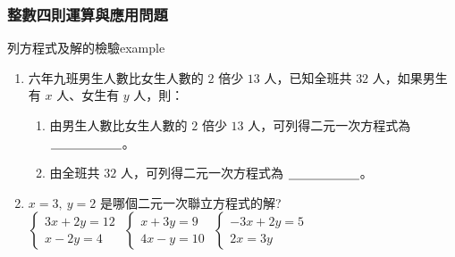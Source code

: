 \documentclass[bwprint,a4paper]{extarticle}
\begin{document}
\subsubsection{整數四則運算與應用問題}
\begin{question}{列方程式及解的檢驗}{example}
	\begin{enumerate}
		\item 六年九班男生人數比女生人數的 $2$ 倍少 $13$ 人，已知全班共 $32$ 人，如果男生有 $x$ 人、女生有 $y$ 人，則：
		\begin{enumerate}
			\item 由男生人數比女生人數的 $2$ 倍少 $13$ 人，可列得二元一次方程式為 $\underline{\hbox to 20mm{}}$。
			\item 由全班共 $32$ 人，可列得二元一次方程式為 $\underline{\hbox to 20mm{}}$。
		\end{enumerate}
		\item $ x=3,\ y=2$ 是哪個二元一次聯立方程式的解?\\[12pt]
    	{$\begin{cases}
    	3x+2y=12\\[8pt]
    	x-2y=4
    \end{cases}$}
    	{$\begin{cases}
    	x+3y=9\\[8pt]
    	4x-y=10
    \end{cases}$}
    	{$\begin{cases}
    	-3x+2y=5\\[8pt]
    	2x=3y
    \end{cases}$}
	\end{enumerate}
\end{question}
\end{document}

